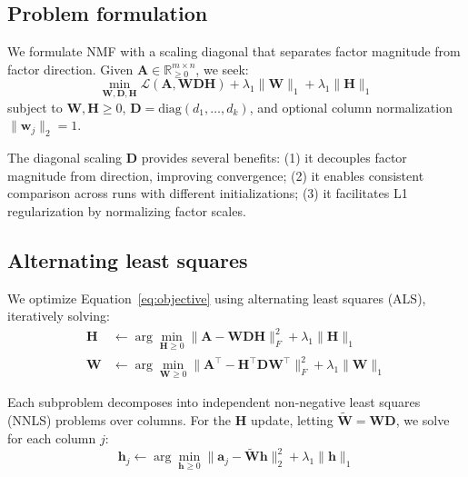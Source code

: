 \documentclass[11pt]{article}
\begin{document}
\subsection{Problem formulation}

We formulate NMF with a scaling diagonal that separates factor magnitude from 
factor direction. Given $\mathbf{A} \in \mathbb{R}_{\geq 0}^{m \times n}$, we 
seek:
\begin{equation}
  \min_{\mathbf{W}, \mathbf{D}, \mathbf{H}} 
  \mathcal{L}(\mathbf{A}, \mathbf{W}\mathbf{D}\mathbf{H}) + 
  \lambda_1 \|\mathbf{W}\|_1 + \lambda_1 \|\mathbf{H}\|_1
  \label{eq:objective}
\end{equation}
subject to $\mathbf{W}, \mathbf{H} \geq 0$, $\mathbf{D} = \text{diag}(d_1, 
\ldots, d_k)$, and optional column normalization $\|\mathbf{w}_j\|_2 = 1$.

The diagonal scaling $\mathbf{D}$ provides several benefits: (1) it decouples 
factor magnitude from direction, improving convergence; (2) it enables 
consistent comparison across runs with different initializations; (3) it 
facilitates L1 regularization by normalizing factor scales.

\subsection{Alternating least squares}

We optimize Equation~\ref{eq:objective} using alternating least squares (ALS), 
iteratively solving:
\begin{align}
  \mathbf{H} &\leftarrow \arg\min_{\mathbf{H} \geq 0} 
  \|\mathbf{A} - \mathbf{W}\mathbf{D}\mathbf{H}\|_F^2 + \lambda_1\|\mathbf{H}\|_1 
  \label{eq:h_update} \\
  \mathbf{W} &\leftarrow \arg\min_{\mathbf{W} \geq 0} 
  \|\mathbf{A}^\top - \mathbf{H}^\top\mathbf{D}\mathbf{W}^\top\|_F^2 + 
  \lambda_1\|\mathbf{W}\|_1
  \label{eq:w_update}
\end{align}

Each subproblem decomposes into independent non-negative least squares (NNLS) 
problems over columns. For the $\mathbf{H}$ update, letting 
$\tilde{\mathbf{W}} = \mathbf{W}\mathbf{D}$, we solve for each column $j$:
\begin{equation}
  \mathbf{h}_j \leftarrow \arg\min_{\mathbf{h} \geq 0} 
  \|\mathbf{a}_j - \tilde{\mathbf{W}}\mathbf{h}\|_2^2 + \lambda_1\|\mathbf{h}\|_1
  \label{eq:nnls}
\end{equation}
\end{document}
